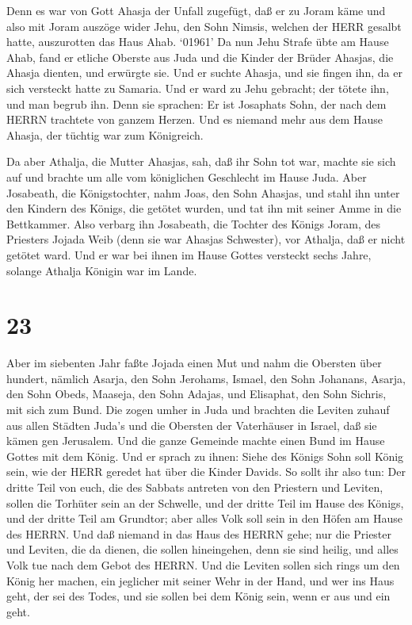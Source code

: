  Denn es war von Gott Ahasja der Unfall zugefügt, daß er zu
Joram käme und also mit Joram auszöge wider Jehu, den Sohn Nimsis,
welchen der HERR gesalbt hatte, auszurotten das Haus Ahab. 
`01961' Da nun Jehu Strafe übte am Hause Ahab, fand er etliche Oberste
aus Juda und die Kinder der Brüder Ahasjas, die Ahasja dienten, und
erwürgte sie.  Und er suchte Ahasja, und sie fingen ihn, da
er sich versteckt hatte zu Samaria. Und er ward zu Jehu gebracht; der
tötete ihn, und man begrub ihn. Denn sie sprachen: Er ist Josaphats
Sohn, der nach dem HERRN trachtete von ganzem Herzen. Und es niemand
mehr aus dem Hause Ahasja, der tüchtig war zum Königreich.

 Da aber Athalja, die Mutter Ahasjas, sah, daß ihr Sohn tot
war, machte sie sich auf und brachte um alle vom königlichen Geschlecht
im Hause Juda.  Aber Josabeath, die Königstochter, nahm
Joas, den Sohn Ahasjas, und stahl ihn unter den Kindern des Königs, die
getötet wurden, und tat ihn mit seiner Amme in die Bettkammer. Also
verbarg ihn Josabeath, die Tochter des Königs Joram, des Priesters
Jojada Weib (denn sie war Ahasjas Schwester), vor Athalja, daß er nicht
getötet ward.  Und er war bei ihnen im Hause Gottes
versteckt sechs Jahre, solange Athalja Königin war im Lande.

\hypertarget{section-22}{%
\section{23}\label{section-22}}

 Aber im siebenten Jahr faßte Jojada einen Mut und nahm die
Obersten über hundert, nämlich Asarja, den Sohn Jerohams, Ismael, den
Sohn Johanans, Asarja, den Sohn Obeds, Maaseja, den Sohn Adajas, und
Elisaphat, den Sohn Sichris, mit sich zum Bund.  Die zogen
umher in Juda und brachten die Leviten zuhauf aus allen Städten Juda's
und die Obersten der Vaterhäuser in Israel, daß sie kämen gen Jerusalem.
 Und die ganze Gemeinde machte einen Bund im Hause Gottes
mit dem König. Und er sprach zu ihnen: Siehe des Königs Sohn soll König
sein, wie der HERR geredet hat über die Kinder Davids.  So
sollt ihr also tun: Der dritte Teil von euch, die des Sabbats antreten
von den Priestern und Leviten, sollen die Torhüter sein an der Schwelle,
 und der dritte Teil im Hause des Königs, und der dritte
Teil am Grundtor; aber alles Volk soll sein in den Höfen am Hause des
HERRN.  Und daß niemand in das Haus des HERRN gehe; nur die
Priester und Leviten, die da dienen, die sollen hineingehen, denn sie
sind heilig, und alles Volk tue nach dem Gebot des HERRN. 
Und die Leviten sollen sich rings um den König her machen, ein jeglicher
mit seiner Wehr in der Hand, und wer ins Haus geht, der sei des Todes,
und sie sollen bei dem König sein, wenn er aus und ein geht.

